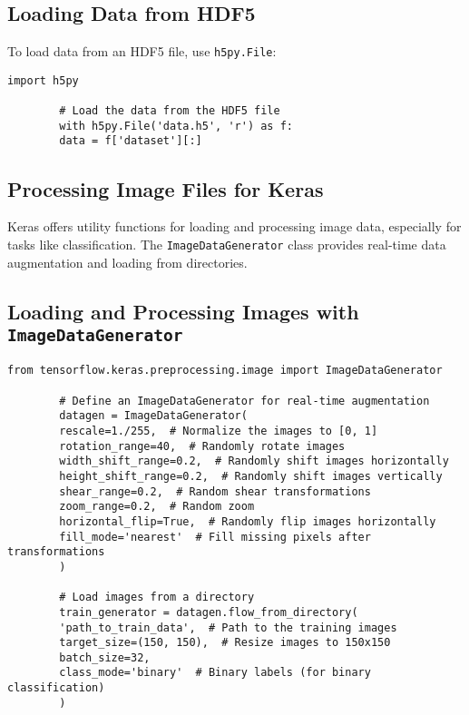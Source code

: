 	\subsection{Loading Data from HDF5}
	To load data from an HDF5 file, use \texttt{h5py.File}:
	
	\begin{lstlisting}[caption={Loading Data from HDF5}, label={code:load-hdf5}, style=pythonstyle]
		import h5py
		
		# Load the data from the HDF5 file
		with h5py.File('data.h5', 'r') as f:
		data = f['dataset'][:]
	\end{lstlisting}
	
	\subsection{Processing Image Files for Keras}
	
	Keras offers utility functions for loading and processing image data, especially for tasks like classification. The \texttt{ImageDataGenerator} class provides real-time data augmentation and loading from directories.
	
	\subsection{Loading and Processing Images with \texttt{ImageDataGenerator}}
	
	\begin{lstlisting}[caption={Loading and Processing Images}, label={code:image-gen}, style=pythonstyle]
		from tensorflow.keras.preprocessing.image import ImageDataGenerator
		
		# Define an ImageDataGenerator for real-time augmentation
		datagen = ImageDataGenerator(
		rescale=1./255,  # Normalize the images to [0, 1]
		rotation_range=40,  # Randomly rotate images
		width_shift_range=0.2,  # Randomly shift images horizontally
		height_shift_range=0.2,  # Randomly shift images vertically
		shear_range=0.2,  # Random shear transformations
		zoom_range=0.2,  # Random zoom
		horizontal_flip=True,  # Randomly flip images horizontally
		fill_mode='nearest'  # Fill missing pixels after transformations
		)
		
		# Load images from a directory
		train_generator = datagen.flow_from_directory(
		'path_to_train_data',  # Path to the training images
		target_size=(150, 150),  # Resize images to 150x150
		batch_size=32,
		class_mode='binary'  # Binary labels (for binary classification)
		)
	\end{lstlisting}
	
